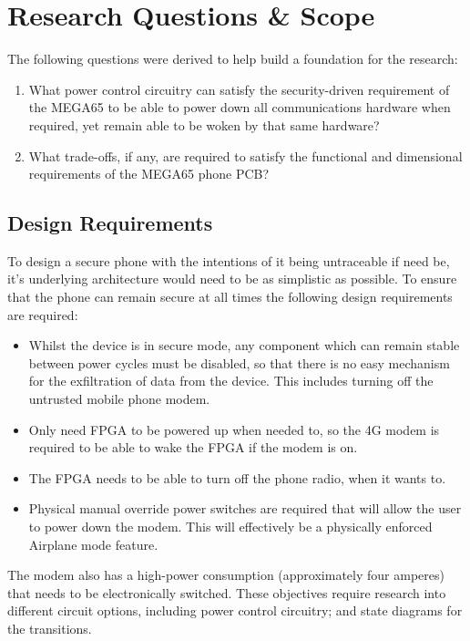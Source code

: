 
\section{Research Questions \& Scope}
The following questions were derived to help build a foundation for the research:
\begin{enumerate}
\item What power control circuitry can satisfy the security-driven requirement of the MEGA65 to be able to power down all communications hardware when required, yet remain able to be woken by that same hardware?
\item What trade-offs, if any, are required to satisfy the functional and dimensional requirements of the MEGA65 phone PCB?
\end{enumerate}

\subsection{Design Requirements}

To design a secure phone with the intentions of it being untraceable if need be, it’s underlying architecture would need to be as simplistic as possible.
To ensure that the phone can remain secure at all times the following design requirements are required:
\begin{itemize}
\item Whilst the device is in secure mode, any component which can remain stable between power cycles must be disabled, so that there is no easy mechanism for the exfiltration of data from the device.
  This includes turning off the untrusted mobile phone modem. 
\item Only need FPGA to be powered up when needed to, so the 4G modem is required to be able to wake the FPGA if the modem is on.
\item The FPGA needs to be able to turn off the phone radio, when it wants to.
\item Physical manual override power switches are required that will allow the user to power down the modem. This will effectively be a physically enforced Airplane mode feature. 
\end{itemize}
The modem also has a high-power consumption (approximately four amperes) that needs to be electronically switched.
These objectives require research into different circuit options, including power control circuitry; and state diagrams for the transitions.

